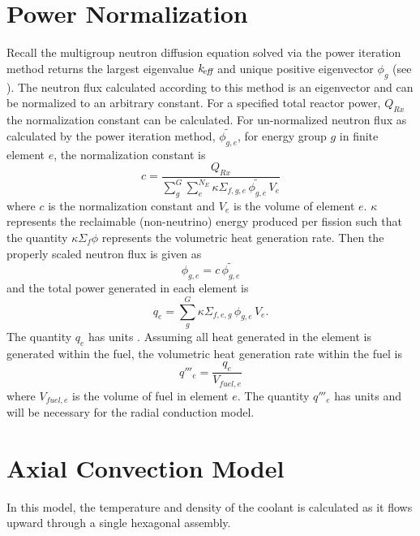 \section{Power Normalization}
  Recall the multigroup neutron diffusion equation solved via the power
  iteration method returns the largest eigenvalue $k_{\!\mbox{\scriptsize \em eff}}$ and unique positive
  eigenvector $\phi_g$ (see ). The neutron flux
  calculated according to this method is an eigenvector and can be normalized
  to an arbitrary constant. For a specified total reactor power, $Q_{Rx}$ the
  normalization constant can be calculated. For un-normalized neutron flux as
  calculated by the power iteration method, $\widetilde{\phi_{g,e}}$, for  
  energy group $g$ in finite element $e$, the normalization constant is 
  \begin{equation}
    \label{eq:normalization_c}
    c = \frac{Q_{Rx}}{\sum_{g}^{G} \sum_{e}^{N_E} \kappa \Sigma_{f,g,e} \,
      \widetilde{\phi_{g,e}} \, V_e}
  \end{equation}
  where $c$ is the normalization constant and $V_e$ is the volume of element
  $e$. $\kappa$ represents the reclaimable (non-neutrino) energy produced per
  fission such that the quantity $\kappa \Sigma_f \phi$ represents the
  volumetric heat generation rate. 
  Then the properly scaled neutron flux is given as
  \begin{equation}
    \label{eq:normalization_phi}
    \phi_{g,e} = c \, \widetilde{\phi_{g,e}}
  \end{equation}
  and the total power generated in each element is 
  \begin{equation}
    \label{eq:elementpwr}
    q_{e} = \sum_g^G \kappa \Sigma_{f,e,g} \, \phi_{g,e} \, V_e .
  \end{equation}
  The quantity $q_e$ has units . Assuming all heat generated in the
  element is generated within the fuel, the volumetric heat generation rate 
  within the fuel is 
  \begin{equation}
    \label{eq:elementqppp_fuel}
    q'''_{e} = \frac{q_e}{V_{fuel,e}}
  \end{equation}
  where $V_{fuel,e}$ is the volume of fuel in element $e$. The quantity $q'''_e$
  has units  and will be necessary for the 
  radial conduction model.

\section{Axial Convection Model}
  \label{sec:axial_convection_model}
  In this model, the temperature and density of the coolant is calculated as
  it flows upward through a single hexagonal assembly.

